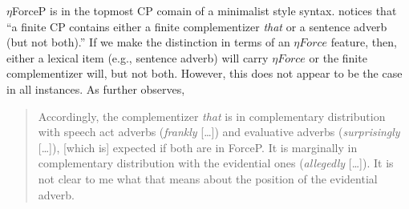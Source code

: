 \documentclass[11pt]{article}
\begin{document}

$\eta$ForceP is in the topmost CP comain of a minimalist style syntax.  notices that ``a finite CP contains either a finite complementizer {\sl that} or a sentence adverb (but not both).'' If we make the distinction in terms of an $\eta Force$ feature, then, either a lexical item (e.g., sentence adverb) will carry $\eta Force$ or the finite complementizer will, but not both. However, this does not appear to be the case in all instances. As  further observes, 

\begin{quote}
Accordingly, the complementizer {\sl that} is in complementary distribution with speech act adverbs ({\sl frankly} [\ldots]) and evaluative adverbs ({\sl surprisingly} [\ldots]), [which is] expected if both are in ForceP. It is marginally in complementary distribution with the evidential ones ({\sl allegedly} [\ldots]). It is not clear to me what that means about the position of the evidential adverb.
\end{quote}
\end{document}
